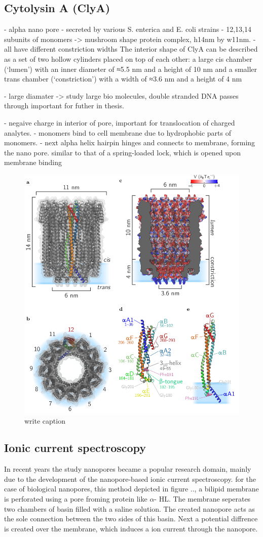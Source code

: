 \subsection{Cytolysin A (ClyA)}

- alpha nano pore
- secreted by various S. enterica and E. coli strains
- 12,13,14 subunits of monomers ->  mushroom shape protein complex, h14nm by w11nm.
- all have different constriction widths
The interior shape of ClyA can be described
as a set of two hollow cylinders placed on top of each other: a large cis chamber
(‘lumen’) with an inner diameter of ≈5.5 nm and a height of 10 nm and a smaller
trans chamber (‘constriction’) with a width of ≈3.6 nm and a height of 4 nm

- large diamater -> study large bio molecules, double stranded DNA passes through
important for futher in thesis.

- negaive charge in interior of pore, important for translocation of charged analytes.
- monomers bind to cell membrane  due to hydrophobic parts of monomers.
- next alpha helix hairpin hinges and connects to membrane, forming the nano pore.
similar to that of a spring-loaded lock, which is opened upon membrane binding


\begin{figure}[h!]
  \centering
  \includegraphics[width=0.5\linewidth]{Figures/cytolysinA.png}
  \caption{write caption}
  \label{adassf}
\end{figure}

\subsection{Ionic current spectroscopy}
In recent years the study nanopores became a popular research domain, mainly
due to the development of the nanopore-based ionic current spectroscopy. for the case of
biological nanopores, this method depicted in figure .., a bilipid membrane is perforated
using a pore froming protein like $\alpha$- HL. The membrane seperates two chambers of
basin filled with a saline solution. The created nanopore acts as the sole connection
between the two sides of this basin. Next a potential diffrence is created over the
membrane, which induces a ion current through the nanopore.

